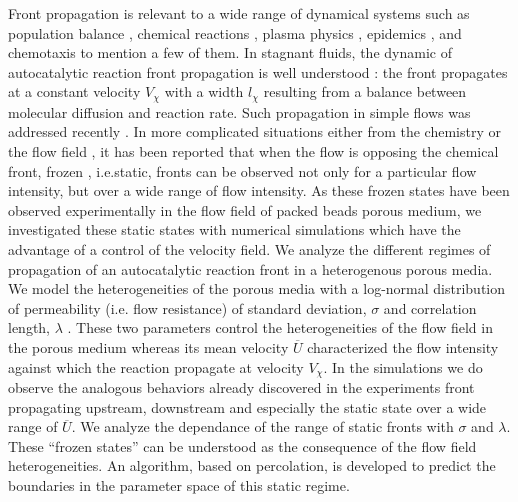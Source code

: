 \documentclass[doublecol]{epl2}
\begin{document}
Front propagation is relevant to a wide range of dynamical systems such as population balance \cite{fisher37,kolmogoroff37}, chemical reactions \cite{scott94}, plasma physics \cite{beule98}, epidemics \cite{russell04}, and chemotaxis \cite{Adler66} to mention a few of them. In stagnant fluids, the dynamic of autocatalytic reaction front propagation is well understood \cite{fisher37,kolmogoroff37,scott94} :
the front propagates at a constant velocity $V_{\chi}$ with a width $l_{\chi}$ resulting from a balance between molecular diffusion and reaction rate.
Such propagation in simple flows was addressed recently \cite{edwards02,leconte03}.
In more complicated situations either from the chemistry \cite{kaern02,koptyug08} or the flow field \cite{schwartz08,atis12,atis12b},
it has been reported that when the flow is opposing the chemical front, frozen , i.e.static, fronts can be observed not only for a particular flow intensity, but over a wide range of flow intensity. As these frozen states have been observed 
experimentally in the flow field of packed beads porous medium, we investigated these static states with numerical simulations which have the advantage of a control of the velocity field.
We analyze the different regimes of propagation of an autocatalytic reaction front in a heterogenous porous media. We model the heterogeneities of the porous media with a log-normal distribution of permeability (i.e. flow resistance) of standard deviation, $\sigma$ and correlation length, $\lambda$ \cite{matheron67,talon03}.
These two parameters control the heterogeneities of the flow field in the porous medium whereas its mean velocity $\overline{U}$ characterized the flow intensity against which the reaction propagate at velocity $V_{\chi}$.  In the simulations we do observe the analogous behaviors already discovered in the experiments \cite{atis12,atis12b} front propagating upstream, downstream and especially the static state over a wide range of $\overline{U}$. We analyze the dependance of the range of static fronts 
with $\sigma$ and $\lambda$.   These ``frozen states'' can be understood as the consequence of the flow field heterogeneities.
An algorithm, based on percolation, is developed  to predict the boundaries in the parameter space of this static regime.


\end{document}
